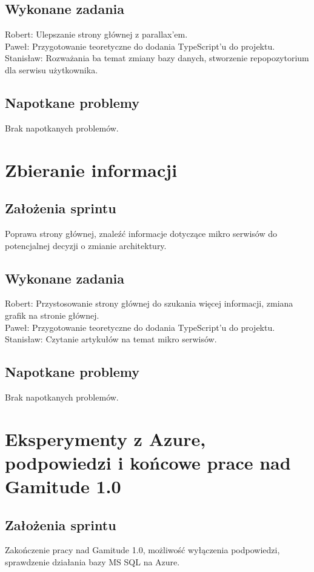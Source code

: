 \documentclass[a4paper,11pt]{report}
\begin{document}
\subsection {Wykonane zadania}
Robert: Ulepszanie strony głównej z parallax'em.\\
Paweł: Przygotowanie teoretyczne do dodania TypeScript'u do projektu.\\
Stanisław: Rozważania ba temat zmiany bazy danych, stworzenie repopozytorium dla serwisu użytkownika.\\
\subsection {Napotkane problemy}
Brak napotkanych problemów.

\section {Zbieranie informacji}
\subsection {Założenia sprintu}
Poprawa strony głównej, znaleźć informacje dotyczące mikro serwisów do potencjalnej decyzji o zmianie architektury.
\subsection {Wykonane zadania}
Robert: Przystosowanie strony głównej do szukania więcej informacji, zmiana grafik na stronie głównej.\\ 
Paweł: Przygotowanie teoretyczne do dodania TypeScript'u do projektu. \\
Stanisław: Czytanie artykułów na temat mikro serwisów.\\
\subsection {Napotkane problemy}
Brak napotkanych problemów.

\section {Eksperymenty z Azure, podpowiedzi i końcowe prace nad Gamitude 1.0}
\subsection {Założenia sprintu}
Zakończenie pracy nad Gamitude 1.0, możliwość wyłączenia podpowiedzi, sprawdzenie działania bazy MS SQL na Azure.
\end{document}

